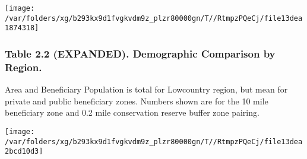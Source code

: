 \documentclass[landscape]{article}
\begin{document}
\texttt{[image: /var/folders/xg/b293kx9d1fvgkvdm9z\_plzr80000gn/T//RtmpzPQeCj/file13dea1874318]}
\pagebreak

\hypertarget{table-2.2-expanded.-demographic-comparison-by-region.}{%
\subsubsection{Table 2.2 (EXPANDED). Demographic Comparison by
Region.}\label{table-2.2-expanded.-demographic-comparison-by-region.}}

Area and Beneficiary Population is total for Lowcountry region, but mean
for private and public beneficiary zones. Numbers shown are for the 10
mile beneficiary zone and 0.2 mile conservation reserve buffer zone
pairing.

\texttt{[image: /var/folders/xg/b293kx9d1fvgkvdm9z\_plzr80000gn/T//RtmpzPQeCj/file13dea2bcd10d3]}
\end{document}
